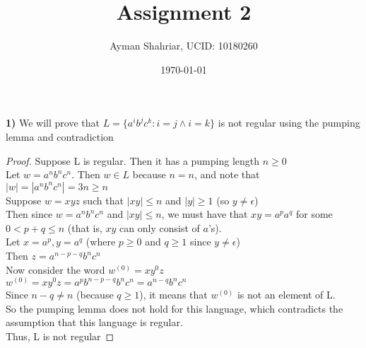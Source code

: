 \documentclass{article}
\title{Assignment 2}
\author{Ayman Shahriar, UCID: 10180260}
\date{\today}
\begin{document}
\maketitle

\textbf{1)} We will prove that $L = \{a^ib^jc^k: i=j \wedge i=k\}$ is not regular using the pumping lemma and contradiction
\begin{proof} Suppose L is regular. Then it has a pumping length $n \geq 0$\\
Let $w = a^nb^nc^n$. Then $w \in L$ because $n=n$, and note that $|w| = |a^n b^n c^n| = 3n \geq n$\\
Suppose $w = xyz$ such that $|xy| \leq n$ and $|y| \geq 1$ (so $y \neq \epsilon$)\\
Then since $w = a^nb^nc^n$ and $|xy| \leq n$, we must have that $xy = a^pa^q$ for some $0 < p+q \leq n$ (that is, $xy$ can only consist of $a$'s).\\
Let $x = a^p, y = a^q$ (where $p \ge 0$ and $q \ge 1$ since $y \neq \epsilon$)\\
Then $z = a^{n-p-q}b^nc^n$\\
Now consider the word $w^{(0)} = xy^0z$\\
$w^{(0)} = xy^0z = a^pb^{n-p-q}b^nc^n = a^{n-q}b^nc^n$\\
Since $n-q \neq n$ (because $q \ge 1$), it means that $w^{(0)}$ is not an element of L.\\
So the pumping lemma does not hold for this language, which contradicts the assumption that this language is regular.\\
Thus, L is not regular
\end{proof}
\end{document}
